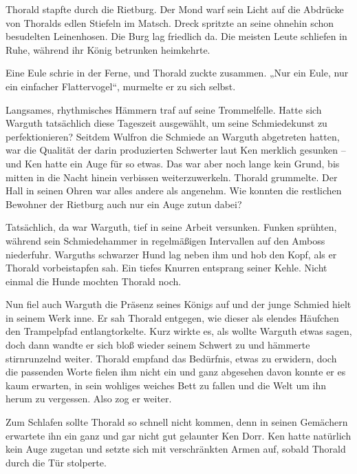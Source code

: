 \trennzeichen



Thorald stapfte durch die Rietburg. Der Mond warf sein Licht auf die Abdrücke von Thoralds edlen Stiefeln im Matsch. Dreck spritzte an seine ohnehin schon besudelten Leinenhosen. Die Burg lag friedlich da. Die meisten Leute schliefen in Ruhe, während ihr König betrunken heimkehrte.

Eine Eule schrie in der Ferne, und Thorald zuckte zusammen. „Nur ein Eule, nur ein einfacher Flattervogel“, murmelte er zu sich selbst.

Langsames, rhythmisches Hämmern traf auf seine Trommelfelle. Hatte sich Warguth tatsächlich diese Tageszeit ausgewählt, um seine Schmiedekunst zu perfektionieren? Seitdem Wulfron die Schmiede an Warguth abgetreten hatten, war die Qualität der darin produzierten Schwerter laut Ken merklich gesunken – und Ken hatte ein Auge für so etwas. Das war aber noch lange kein Grund, bis mitten in die Nacht hinein verbissen weiterzuwerkeln. Thorald grummelte. Der Hall in seinen Ohren war alles andere als angenehm. Wie konnten die restlichen Bewohner der Rietburg auch nur ein Auge zutun dabei?

Tatsächlich, da war Warguth, tief in seine Arbeit versunken. Funken sprühten, während sein Schmiedehammer in regelmäßigen Intervallen auf den Amboss niederfuhr. Warguths schwarzer Hund lag neben ihm und hob den Kopf, als er Thorald vorbeistapfen sah. Ein tiefes Knurren entsprang seiner Kehle. Nicht einmal die Hunde mochten Thorald noch.

Nun fiel auch Warguth die Präsenz seines Königs auf und der junge Schmied hielt in seinem Werk inne. Er sah Thorald entgegen, wie dieser als elendes Häufchen den Trampelpfad entlangtorkelte. Kurz wirkte es, als wollte Warguth etwas sagen, doch dann wandte er sich bloß wieder seinem Schwert zu und hämmerte stirnrunzelnd weiter. Thorald empfand das Bedürfnis, etwas zu erwidern, doch die passenden Worte fielen ihm nicht ein und ganz abgesehen davon konnte er es kaum erwarten, in sein wohliges weiches Bett zu fallen und die Welt um ihn herum zu vergessen. Also zog er weiter.



\trennzeichen



Zum Schlafen sollte Thorald so schnell nicht kommen, denn in seinen Gemächern erwartete ihn ein ganz und gar nicht gut gelaunter Ken Dorr. Ken hatte natürlich kein Auge zugetan und setzte sich mit verschränkten Armen auf, sobald Thorald durch die Tür stolperte.

